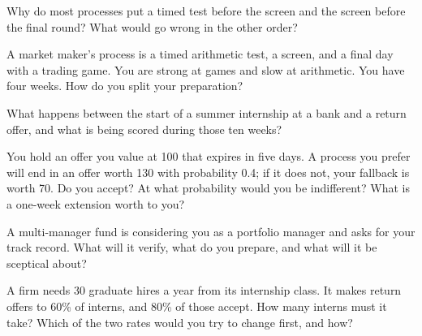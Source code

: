 \begin{interviewq}\label{iq:iv:the-process-by-firm-type:1}
Why do most processes put a timed test before the screen and the screen before the final round? What would
go wrong in the other order?
\end{interviewq}

\begin{interviewq}\label{iq:iv:the-process-by-firm-type:2}
A market maker's process is a timed arithmetic test, a screen, and a final day with a trading game. You are
strong at games and slow at arithmetic. You have four weeks. How do you split your preparation?
\end{interviewq}

\begin{interviewq}\label{iq:iv:the-process-by-firm-type:3}
What happens between the start of a summer internship at a bank and a return offer, and what is being scored
during those ten weeks?
\end{interviewq}

\begin{interviewq}\label{iq:iv:the-process-by-firm-type:4}
You hold an offer you value at 100 that expires in five days. A process you prefer will end in an offer
worth 130 with probability 0.4; if it does not, your fallback is worth 70. Do you accept? At what probability
would you be indifferent? What is a one-week extension worth to you?
\end{interviewq}

\begin{interviewq}\label{iq:iv:the-process-by-firm-type:5}
A multi-manager fund is considering you as a portfolio manager and asks for your track record. What will it
verify, what do you prepare, and what will it be sceptical about?
\end{interviewq}

\begin{interviewq}\label{iq:iv:the-process-by-firm-type:6}
A firm needs 30 graduate hires a year from its internship class. It makes return offers to 60\% of interns,
and 80\% of those accept. How many interns must it take? Which of the two rates would you try to change
first, and how?
\end{interviewq}

